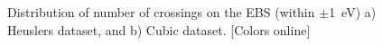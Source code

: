 \documentclass[article]{elsarticle}
\begin{document}
\begin{figure}[H]
        \quad
\caption{Distribution of number of crossings on the EBS (within $\pm$\SI{1}{\electronvolt}) a) Heuslers dataset, and b) Cubic dataset. [Colors online]}
\label{fig:dataset_croos}
\end{figure}
\end{document}
